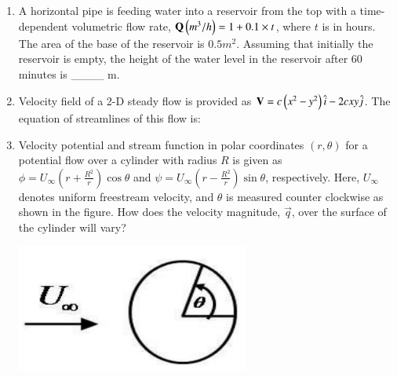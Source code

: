 \documentclass[journal,12pt,onecolumn]{IEEEtran}
\theoremstyle{remark}
\begin{document}
\begin{enumerate}
\item A horizontal pipe is feeding water into a reservoir from the top with a time-dependent volumetric flow rate, $\mathbf{Q}\left(m^{3}/h\right) = 1+0.1 \times t$, where $t$ is in hours. The area of the base of the reservoir is $0.5 m^2$. Assuming that initially the reservoir is empty, the height of the water level in the reservoir after 60 minutes is \_\_\_\_ m.\\

\item Velocity field of a 2-D steady flow is provided as $\mathbf{V} = c\left(x^2-y^2\right)\hat{i} - 2cxy\hat{j}$. The equation of streamlines of this flow is:

\begin{enumerate}
\end{enumerate}

\item Velocity potential and stream function in polar coordinates $(r, \theta)$ for a potential flow over a cylinder with radius $R$ is given as $\phi = U_\infty \left(r + \frac{R^2}{r}\right)\cos\theta$ and $\psi = U_\infty \left(r - \frac{R^2}{r}\right)\sin\theta$, respectively. Here, $U_\infty$ denotes uniform freestream velocity, and $\theta$ is measured counter clockwise as shown in the figure. How does the velocity magnitude, $\vec{q}$, over the surface of the cylinder will vary?

\begin{center}
	\includegraphics[width=0.6\textwidth]{figs/36.png}
\end{center}

\begin{enumerate}
\end{enumerate}


\end{enumerate}
\end{document}
